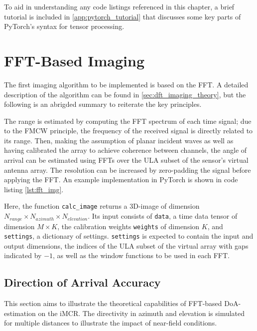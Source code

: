 To aid in understanding any code listings referenced in this chapter,
a brief tutorial is included in \cref{app:pytorch_tutorial}
that discusses some key parts of PyTorch's syntax for tensor processing.

\section{FFT-Based Imaging}
\label{sec:fft_imaging}
The first imaging algorithm to be implemented is based on the FFT.
A detailed description of the algorithm can be found in \cref{sec:dft_imaging_theory},
but the following is an abrigded summary to reiterate the key principles.

The range is estimated by computing the FFT spectrum of each time signal;
due to the FMCW principle, the frequency of the received signal is directly related to its range.
Then, making the assumption of planar incident waves
as well as having calibrated the array to achieve coherence between channels,
the angle of arrival can be estimated using FFTs over the ULA subset of the sensor's virtual antenna array.
The resolution can be increased by zero-padding the signal before applying the FFT.
An example implementation in PyTorch is shown in code listing \ref{lst:fft_img}.

Here, the function \verb|calc_image| returns a 3D-image of dimension $N_{range} \times N_{azimuth} \times N_{elevation}$.
Its input consists of \verb|data|, a time data tensor of dimension $M \times K$,
the calibration weights \verb|weights| of dimension $K$, and \verb|settings|, a dictionary of settings.
\verb|settings| is expected to contain the input and output dimensions,
the indices of the ULA subset of the virtual array with gaps indicated by $-1$,
as well as the window functions to be used in each FFT.

\subsection{Direction of Arrival Accuracy}
\label{sec:fft_doa}
This section aims to illustrate the theoretical capabilities of FFT-based DoA-estimation on the iMCR.
The directivity in azimuth and elevation is simulated for multiple distances to illustrate the impact of near-field conditions.
\\


